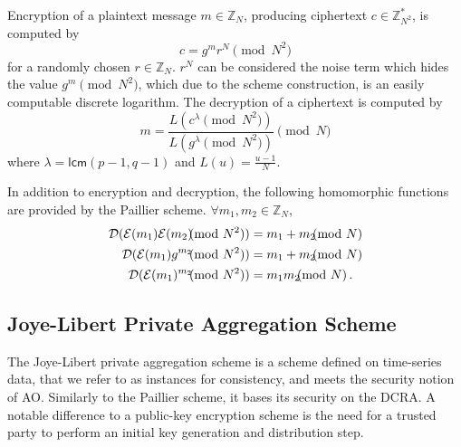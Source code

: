 \documentclass[10pt,journal,compsoc]{IEEEtran}
\theoremstyle{definition}
\theoremstyle{definition}
\theoremstyle{remark}
\begin{document}
Encryption of a plaintext message $m \in \mathbb{Z}_N$, producing ciphertext $c \in \mathbb{Z}^{*}_{N^2}$, is computed by
\begin{equation}
    c = g^m r^N \pmod{N^2}
\end{equation}
for a randomly chosen $r \in \mathbb{Z}_{N}$. $r^N$ can be considered the noise term which hides the value $g^m \pmod{N^2}$, which due to the scheme construction, is an easily computable discrete logarithm. The decryption of a ciphertext is computed by
\begin{equation}
    m = \frac{L(c^\lambda\pmod{N^2})}{L(g^\lambda\pmod{N^2})} \pmod{N}
\end{equation}
where $\lambda = \mathsf{lcm}(p-1, q-1)$ and $L(u) = \frac{u-1}{N}$.

In addition to encryption and decryption, the following homomorphic functions are provided by the Paillier scheme. $\forall m_1,m_2 \in \mathbb{Z}_N$,
\begin{align}
    \mathcal{D}(\mathcal{E}(m_1)\mathcal{E}(m_2) \hspace{-7pt} \pmod{N^2}) &= m_1+m_2 \hspace{-7pt} \pmod{N} \\
    \mathcal{D}(\mathcal{E}(m_1)g^{m_2} \hspace{-7pt} \pmod{N^2}) &= m_1+m_2\hspace{-7pt}\pmod{N} \label{eqn:paillier_hom_plain_add}\\
    \mathcal{D}(\mathcal{E}(m_1)^{m_2} \hspace{-7pt} \pmod{N^2}) &= m_1m_2 \hspace{-7pt} \pmod{N}\,. \label{eqn:paillier_hom_mult}
\end{align}

% 
% 

\subsection{Joye-Libert Private Aggregation Scheme} \label{subsec:joye_libert_scheme}
The Joye-Libert private aggregation scheme \cite{joyeScalableSchemePrivacyPreserving2013} is a scheme defined on time-series data, that we refer to as instances for consistency, and meets the security notion of AO. Similarly to the Paillier scheme, it bases its security on the DCRA. A notable difference to a public-key encryption scheme is the need for a trusted party to perform an initial key generation and distribution step.
\end{document}
